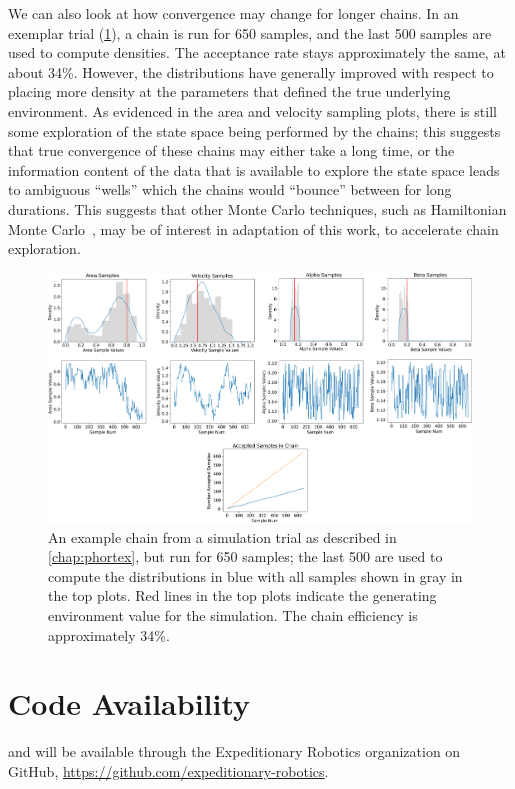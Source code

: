 We can also look at how convergence may change for longer chains. In an exemplar trial (\cref{fig:phumes_long_chain}), a chain is run for 650 samples, and the last 500 samples are used to compute densities. The acceptance rate stays approximately the same, at about 34\%. However, the distributions have generally improved with respect to placing more density at the parameters that defined the true underlying environment. As evidenced in the area and velocity sampling plots, there is still some exploration of the state space being performed by the chains; this suggests that true convergence of these chains may either take a long time, or the information content of the data that is available to explore the state space leads to ambiguous ``wells'' which the chains would ``bounce'' between for long durations. This suggests that other Monte Carlo techniques, such as Hamiltonian Monte Carlo~\autocite{duane1987hybrid}, may be of interest in adaptation of this work, to accelerate chain exploration.

\begin{figure}[h!]
    \centering
    \includegraphics[width=1\columnwidth]{figures/phumes_long_chain.png}
    \caption[\PHUMES long chain]{An example chain from a simulation trial as described in \cref{chap:phortex}, but run for 650 samples; the last 500 are used to compute the distributions in blue with all samples shown in gray in the top plots. Red lines in the top plots indicate the generating environment value for the simulation. The chain efficiency is approximately 34\%.}
    \label{fig:phumes_long_chain}
\end{figure}

\section{Code Availability}
\PHUMES and \PHORTEX will be available through the Expeditionary Robotics organization on GitHub, \url{https://github.com/expeditionary-robotics}.


